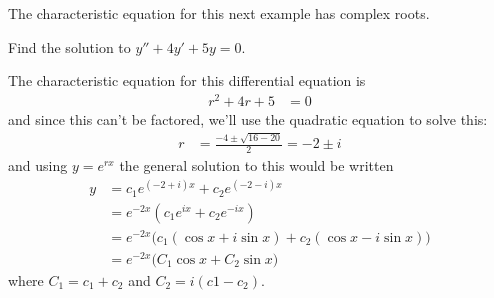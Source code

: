 The characteristic equation for this next example has complex roots.

\begin{example}
Find the solution to $y'' + 4y' +5y=0$.

\solution

The characteristic equation for this differential equation is
%
\begin{align*}
r^2 + 4r + 5 & = 0
\end{align*}
and since this can't be factored, we'll use the quadratic equation to solve this:
%
\begin{align*}
r & = \frac{-4 \pm \sqrt{16-20}}{2} = -2 \pm i
\end{align*}
and  using $y=e^{rx}$ the general solution to this would be written
%
\begin{align*}
y & = c_1 e^{(-2 + i)x} + c_2 e^{(-2-i)x}\\
& = e^{-2x} (c_1 e^{ix} + c_2 e^{-ix}) \\
& = e^{-2x} \bigl( c_1 (\cos x + i \sin x) + c_2 (\cos x - i \sin x) \bigr) \\
& = e^{-2x} \bigl( C_1 \cos x + C_2 \sin x \bigr)
\end{align*}
where $C_1 = c_1+c_2$ and $C_2 = i (c1-c_2)$.
\end{example}

